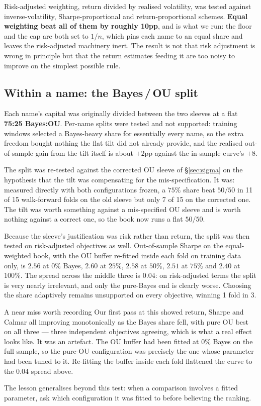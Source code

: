 \documentclass[11pt]{article}
\begin{document}
Risk-adjusted weighting, return divided by realised volatility, was tested against
inverse-volatility, Sharpe-proportional and return-proportional schemes. \textbf{Equal weighting
beat all of them by roughly 10pp}, and is what we run: the floor and the cap are both set to
$1/n$, which pins each name to an equal share and leaves the risk-adjusted machinery inert. The
result is not that risk adjustment is wrong in principle but that the return estimates feeding it
are too noisy to improve on the simplest possible rule.

\subsection{Within a name: the Bayes\,/\,OU split}
Each name's capital was originally divided between the two sleeves at a flat \textbf{75:25
Bayes:OU}. Per-name splits were tested and not supported: training windows selected a
Bayes-heavy share for essentially every name, so the extra freedom bought nothing the flat tilt
did not already provide, and the realised out-of-sample gain from the tilt itself is about
$+2$pp against the in-sample curve's $+8$.

The split was re-tested against the corrected OU sleeve of \S\ref{sec:sigma} on the hypothesis
that the tilt was compensating for the mis-specification. It was: measured directly with both
configurations frozen, a $75\%$ share beat $50/50$ in 11 of 15 walk-forward folds on the old
sleeve but only 7 of 15 on the corrected one. The tilt was worth something against a
mis-specified OU sleeve and is worth nothing against a correct one, so the book now runs a flat
$50/50$.

Because the sleeve's justification was risk rather than return, the split was then tested on
risk-adjusted objectives as well. Out-of-sample Sharpe on the equal-weighted book, with the OU
buffer re-fitted inside each fold on training data only, is $2.56$ at $0\%$ Bayes, $2.60$ at
$25\%$, $2.58$ at $50\%$, $2.51$ at $75\%$ and $2.40$ at $100\%$. The spread across the middle
three is $0.04$: on risk-adjusted terms the split is very nearly irrelevant, and only the pure-Bayes
end is clearly worse. Choosing the share adaptively remains unsupported on every objective, winning
1 fold in 3.

\begin{keybox}{A near miss worth recording}
Our first pass at this showed return, Sharpe and Calmar all improving monotonically as the Bayes
share fell, with pure OU best on all three --- three independent objectives agreeing, which is
what a real effect looks like. It was an artefact. The OU buffer had been fitted at $0\%$ Bayes on
the full sample, so the pure-OU configuration was precisely the one whose parameter had been tuned
to it. Re-fitting the buffer inside each fold flattened the curve to the $0.04$ spread above.

The lesson generalises beyond this test: when a comparison involves a fitted parameter, ask which
configuration it was fitted to before believing the ranking.
\end{keybox}
\end{document}
